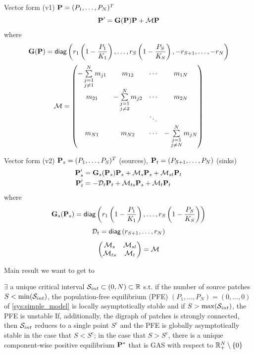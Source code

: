 \documentclass[aspectratio=169]{beamer}
\begin{document}
\begin{frame}{Vector form (v1)}
	$\bP=(P_1,\ldots,P_N)^T$
	\vfill
	\[
	\bP' = \bG(\bP)\bP+\M\bP
	\]
	where
	\[
	\bG(\bP) =
	\diag\left(
	r_1\left(1-\frac{P_1}{K_1}\right),\ldots,r_S\left(1-\frac{P_S}{K_S}\right),
	-r_{S+1},\ldots,-r_N
	\right)
	\]
	\[
	\M =
	\begin{pmatrix}
	-\sum\limits_{\substack{j=1\\j\neq 1}}^N m_{j1} & m_{12} & \cdots & m_{1N} \\
	m_{21} & -\sum\limits_{\substack{j=1\\j\neq 2}}^N m_{j2} & \cdots & m_{2N} \\
	& & \ddots & \\
	m_{N1} & m_{N2} & \cdots & -\sum\limits_{\substack{j=1\\j\neq N}}^N m_{jN}
	\end{pmatrix}
	\]
\end{frame}
	
\begin{frame}{Vector form (v2)}
	$\bP_s=(P_1,\ldots,P_S)^T$ (sources), \quad $\bP_t =(P_{S+1},\ldots,P_N)$ (sinks)
	\vfill
	\begin{align*}
	\bP_s' &= \bG_s(\bP_s)\bP_s+\M_s\bP_s+\M_{st}\bP_t \\
	\bP_t' &= -\D_t\bP_t+\M_{ts}\bP_s+\M_t\bP_t
	\end{align*}
	where
	\[
	\bG_s(\bP_s) =
	\diag\left(
	r_1\left(1-\frac{P_1}{K_1}\right),\ldots,r_S\left(1-\frac{P_S}{K_S}\right)
	\right)
	\]
	\[
	\D_t = \diag\left(r_{S+1},\ldots,r_N\right)
	\]
	\begin{equation}\label{eq:M_blocks}
	\begin{pmatrix}
	\M_s & \M_{st} \\ \M_{ts} & \M_t
	\end{pmatrix} = \M
	\end{equation}
\end{frame}


\begin{frame}{Main result we want to get to}
	\begin{theorem}\label{th:main_result}
		$\exists$ a unique critical interval $\S_{int}\subset(0,N)\subset\IR$ s.t. if the number of source patches $S<\min(\S_{int})$, the population-free equilibrium (PFE) $(P_1,\ldots,P_N)=(0,\ldots,0)$ of \eqref{sys:simple_model} is locally asymptotically stable and if $S>\max(\S_{int})$, the PFE is unstable
		\vskip0.5cm
		If, additionally, the digraph of patches is strongly connected, then $\S_{int}$ reduces to a single point $S^c$ and the PFE is globally asymptotically stable in the case that $S<S^c$; in the case that $S>S^c$, there is a unique component-wise positive equilibrium $\bP^*$ that is GAS with respect to $\IR_+^N\setminus\{0\}$
		\end{theorem}
		
\end{frame}
\end{document}
